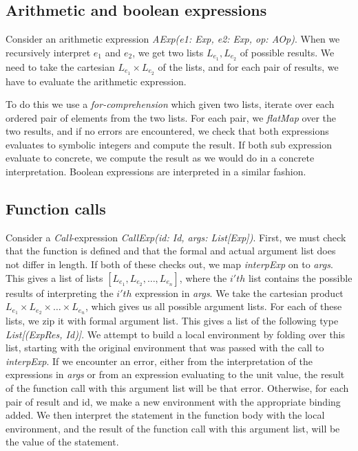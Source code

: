 \subsection{Arithmetic and boolean expressions}
Consider an arithmetic expression 
\textsl{AExp(e1: Exp, e2: Exp, op: AOp)}. When we recursively interpret $e_1$ and $e_2$, we get two lists $L_{e_1}, L_{e_2}$ of possible results. We need to take the cartesian $L_{e_1} \times L_{e_2}$ of the lists, and for each pair of results, we have to evaluate the arithmetic expression. 

To do this we use a \textsl{for-comprehension} which given two lists, iterate over each ordered pair of elements from the two lists.  For each pair, we \textsl{flatMap} over the two results, and if no errors are encountered, we check that both expressions evaluates to symbolic integers and compute the result. If both sub expression evaluate to concrete, we compute the result as we would do in a concrete interpretation. 
Boolean expressions are interpreted in a similar fashion.

\subsection{Function calls}
Consider a \textsl{Call}-expression \textsl{CallExp(id: Id, args: List[Exp])}.
First, we must check that the function is defined and that the formal and actual argument list does not differ in length. If both of these checks out, we map \textsl{interpExp} on to \textsl{args}. This gives a list of lists $[L_{e_1}, L_{e_2}, \ldots, L_{e_n}]$, where the $i'th$ list contains the possible results of interpreting the $i'th$ expression in \textsl{args}.
We take the cartesian product $L_{e_1} \times L_{e_2} \times \ldots \times L_{e_n}$, which gives us all possible argument lists. For each of these lists, we zip it with formal argument list. This gives a list of the following type \textsl{List[(ExpRes, Id)]}. We attempt to build a local environment by folding over this list, starting with the original environment that was passed with the call to \textsl{interpExp}. If we encounter an error, either from the interpretation of the expressions in \textsl{args} or from an expression evaluating to the unit value, the result of the function call with this argument list will be that error. Otherwise, for each pair of result and id, we make a new environment with the appropriate binding added. We then interpret the statement in the function body  with the local environment, and the result of the function call with this argument list, will be the value of the statement. 


